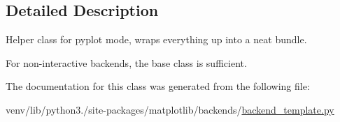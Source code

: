 \subsection{Detailed Description}
\begin{DoxyVerb}Helper class for pyplot mode, wraps everything up into a neat bundle.

For non-interactive backends, the base class is sufficient.
\end{DoxyVerb}
 

The documentation for this class was generated from the following file\+:\begin{DoxyCompactItemize}
\item 
venv/lib/python3./site-\/packages/matplotlib/backends/\hyperlink{backend__template_8py}{backend\+\_\+template.\+py}\end{DoxyCompactItemize}
